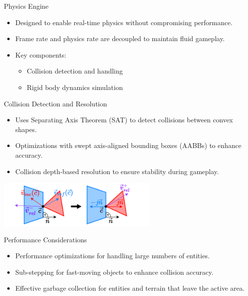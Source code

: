 \begin{frame}{Physics Engine}
    \begin{itemize}
        \item Designed to enable real-time physics without compromising performance.
        \item Frame rate and physics rate are decoupled to maintain fluid gameplay.
        \item Key components:
        \begin{itemize}
            \item Collision detection and handling
            \item Rigid body dynamics simulation
        \end{itemize}
    \end{itemize}
\end{frame}

\begin{frame}{Collision Detection and Resolution}
    \begin{itemize}
        \item Uses Separating Axis Theorem (SAT) to detect collisions between convex shapes.
        \item Optimizations with swept axis-aligned bounding boxes (AABBs) to enhance accuracy.
        \item Collision depth-based resolution to ensure stability during gameplay.
    \end{itemize}
    \centering
    \includegraphics[width=0.6\textwidth]{../figures/physics/resolution.pdf} %
\end{frame}

\begin{frame}{Performance Considerations}
    \begin{itemize}
        \item Performance optimizations for handling large numbers of entities.
        \item Sub-stepping for fast-moving objects to enhance collision accuracy.
        \item Effective garbage collection for entities and terrain that leave the active area.
    \end{itemize}
\end{frame}
